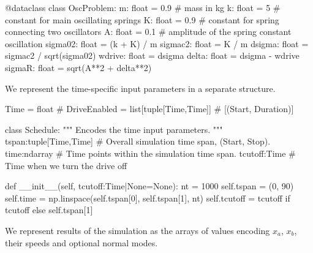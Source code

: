   \begin{python}
  @dataclass
  class OscProblem:
    m:       float = 0.9   # mass in kg
    k:       float = 5     # constant for main oscillating springs
    K:       float = 0.9   # constant for spring connecting two oscillators
    A:       float = 0.1   # amplitude of the spring constant oscillation
    sigma02: float = (k + K) / m
    sigmac2: float = K / m
    dsigma:  float = sigmac2 / sqrt(sigma02)
    wdrive:  float = dsigma
    delta:   float = dsigma - wdrive
    sigmaR:  float = sqrt(A**2 + delta**2)
  \end{python}


We represent the time-specific input parameters in a separate structure.

  \begin{python}
  Time = float
  # DriveEnabled = list[tuple[Time,Time]]  # [(Start, Duration)]
  
  class Schedule:
    """ Encodes the time input parameters. """
    tspan:tuple[Time,Time]   # Overall simulation time span, (Start, Stop).
    time:ndarray             # Time points within the simulation time span.
    tcutoff:Time             # Time when we turn the drive off
  
    def __init__(self, tcutoff:Time|None=None):
      nt = 1000
      self.tspan = (0, 90)
      self.time = np.linspace(self.tspan[0], self.tspan[1], nt)
      self.tcutoff = tcutoff if tcutoff else self.tspan[1]
  \end{python}


We represent results of the simulation as the arrays of values encoding $x_a$, $x_b$, their
speeds and optional normal modes.


  \begin{comment}
    \begin{sh}
    printf '\\begin{%
    cat $PROJECT_ROOT/python/mechanical_bloch.py | sedlines.sh Simulation
    printf '\\end{%
    \end{sh}
  \end{comment}

